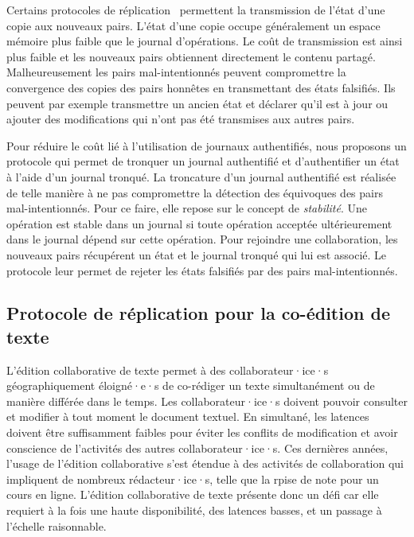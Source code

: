 Certains protocoles de réplication~\autocite{feldman2010sporc,almeida_2018_delta-crdt-revisited} permettent la transmission de l'état d'une copie aux nouveaux pairs.
L'état d'une copie occupe généralement un espace mémoire plus faible que le journal d'opérations.
Le coût de transmission est ainsi plus faible et les nouveaux pairs obtiennent directement le contenu partagé.
Malheureusement les pairs mal-intentionnés peuvent compromettre la convergence des copies des pairs honnêtes en transmettant des états falsifiés.
Ils peuvent par exemple transmettre un ancien état et déclarer qu'il est à jour ou ajouter des modifications qui n'ont pas été transmises aux autres pairs.

Pour réduire le coût lié à l'utilisation de journaux authentifiés, nous proposons un protocole qui permet de tronquer un journal authentifié et d'authentifier un état à l'aide d'un journal tronqué.
La troncature d'un journal authentifié est réalisée de telle manière à ne pas compromettre la détection des équivoques des pairs mal-intentionnés.
Pour ce faire, elle repose sur le concept de \emph{stabilité}.
Une opération est stable dans un journal si toute opération acceptée ultérieurement dans le journal dépend sur cette opération.
Pour rejoindre une collaboration, les nouveaux pairs récupérent un état et le journal tronqué qui lui est associé.
Le protocole leur permet de rejeter les états falsifiés par des pairs mal-intentionnés.


\subsection{Protocole de réplication pour la co-édition de texte}


L'édition collaborative de texte permet à des collaborateur·ice·s géographiquement éloigné·e·s de co-rédiger un texte simultanément ou de manière différée dans le temps.
Les collaborateur·ice·s doivent pouvoir consulter et modifier à tout moment le document textuel.
En simultané, les latences doivent être suffisamment faibles pour éviter les conflits de modification et avoir conscience de l'activités des autres collaborateur·ice·s.
Ces dernières années, l'usage de l'édition collaborative s'est étendue à des activités de collaboration qui impliquent de nombreux rédacteur·ice·s, telle que la rpise de note pour un cours en ligne.
L'édition collaborative de texte présente donc un défi car elle requiert à la fois une haute disponibilité, des latences basses, et un passage à l'échelle raisonnable.


